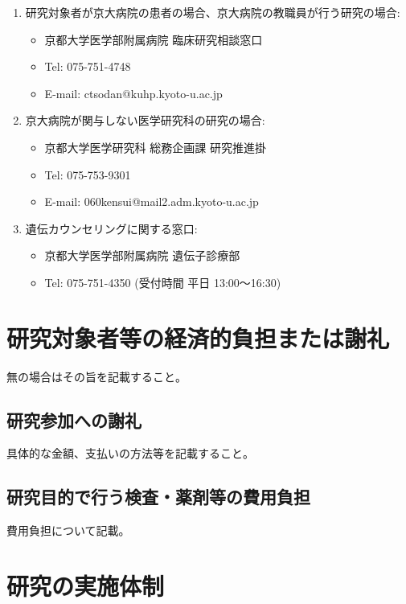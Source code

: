 \documentclass{kyodai-protocol}
\begin{document}
\begin{enumerate}
\item 研究対象者が京大病院の患者の場合、京大病院の教職員が行う研究の場合:
  \begin{itemize}
  \item 京都大学医学部附属病院 臨床研究相談窓口
  \item Tel: 075-751-4748
  \item E-mail: ctsodan@kuhp.kyoto-u.ac.jp
  \end{itemize}

\item 京大病院が関与しない医学研究科の研究の場合:
  \begin{itemize}
  \item 京都大学医学研究科 総務企画課 研究推進掛
  \item Tel: 075-753-9301
  \item E-mail: 060kensui@mail2.adm.kyoto-u.ac.jp
  \end{itemize}

\item 遺伝カウンセリングに関する窓口:
  \begin{itemize}
  \item 京都大学医学部附属病院 遺伝子診療部
  \item Tel: 075-751-4350 (受付時間 平日 13:00〜16:30)
  \end{itemize}
\end{enumerate}

\section{研究対象者等の経済的負担または謝礼}
\label{sec:compensation}

無の場合はその旨を記載すること。

\subsection{研究参加への謝礼}

具体的な金額、支払いの方法等を記載すること。

\subsection{研究目的で行う検査・薬剤等の費用負担}

費用負担について記載。

\section{研究の実施体制}
\label{sec:organization}
\end{document}
